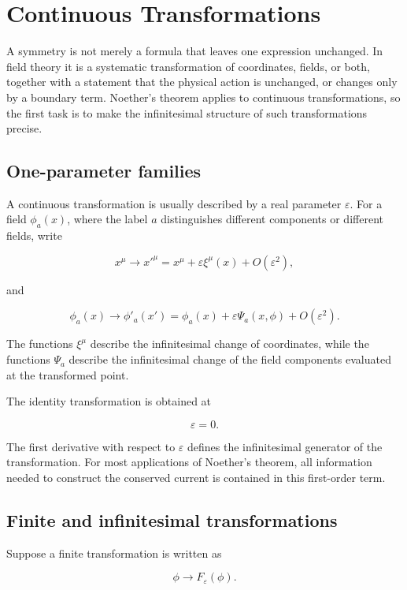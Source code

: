 \section{Continuous Transformations}
\label{sec:continuous_transformations}

A symmetry is not merely a formula that leaves one expression unchanged. In field theory it is a systematic transformation of coordinates, fields, or both, together with a statement that the physical action is unchanged, or changes only by a boundary term. Noether's theorem applies to continuous transformations, so the first task is to make the infinitesimal structure of such transformations precise.

\subsection{One-parameter families}

A continuous transformation is usually described by a real parameter \(\varepsilon\). For a field \(\phi_a(x)\), where the label \(a\) distinguishes different components or different fields, write

\[
x^{\mu}
\longrightarrow
x'^{\mu}
=
x^{\mu}
+
\varepsilon \xi^{\mu}(x)
+
O(\varepsilon^{2}),
\]

and

\[
\phi_a(x)
\longrightarrow
\phi'_a(x')
=
\phi_a(x)
+
\varepsilon \Psi_a(x,\phi)
+
O(\varepsilon^{2}).
\]

The functions \(\xi^{\mu}\) describe the infinitesimal change of coordinates, while the functions \(\Psi_a\) describe the infinitesimal change of the field components evaluated at the transformed point.

The identity transformation is obtained at

\[
\varepsilon=0.
\]

The first derivative with respect to \(\varepsilon\) defines the infinitesimal generator of the transformation. For most applications of Noether's theorem, all information needed to construct the conserved current is contained in this first-order term.

\subsection{Finite and infinitesimal transformations}

Suppose a finite transformation is written as

\[
\phi
\longrightarrow
F_{\varepsilon}(\phi).
\]

